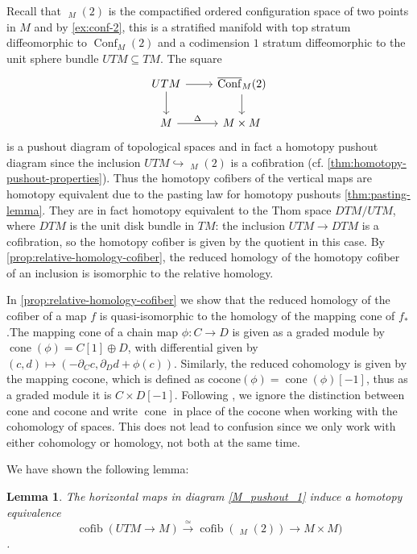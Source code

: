 \documentclass{scrartcl}
\theoremstyle{plain}
\newtheorem{lemma}[theorem]{Lemma}
\theoremstyle{definition}
\renewcommand{\subset}{\subseteq}
\DeclareMathOperator{\cone}{cone}
\DeclareMathOperator{\cofib}{cofib}
\newcommand{\quiso}{\simeq}
\let\xto\xrightarrow
\newcommand{\injto}{\hookrightarrow}
\DeclareMathOperator{\Conf}{Conf}
\DeclareMathOperator{\cConf}{\overline{Conf}}
\begin{document}
Recall that $\cConf_M(2)$ is the compactified ordered configuration space of two points in $M$ and by \cref{ex:conf-2}, this is a stratified manifold with top stratum diffeomorphic to $\Conf_M(2)$ and a codimension $1$ stratum diffeomorphic to the unit sphere bundle $UTM\subset TM$. The square
\begin{equation}\label{M_pushout_1}
\begin{tikzcd}
    UTM \dar\rar & \cConf_M(2)\dar \\
    M \rar["\Delta"] & M\times M
\end{tikzcd}
\end{equation}
is a pushout diagram of topological spaces and in fact a homotopy pushout diagram since the inclusion $UTM \injto \cConf_M(2)$ is a cofibration (cf. \cref{thm:homotopy-pushout-properties}). Thus the homotopy cofibers of the vertical maps are homotopy equivalent due to the pasting law for homotopy pushouts \cref{thm:pasting-lemma}. They are in fact homotopy equivalent to the Thom space $DTM / UTM$, where $DTM$ is the unit disk bundle in $TM$: the inclusion $UTM\to DTM$ is a cofibration, so the homotopy cofiber is given by the quotient in this case. By \cref{prop:relative-homology-cofiber}, the reduced homology of the homotopy cofiber of an inclusion is isomorphic to the relative homology. 

In \cref{prop:relative-homology-cofiber} we show that the reduced homology of the cofiber of a map $f$ is quasi-isomorphic to the homology of the mapping cone of $f_*$.The mapping cone of a chain map $\phi\colon C\to D$ is given as a graded module by $\cone(\phi) = C[1]\oplus D$, with differential given by $(c, d)\mapsto (-\partial_C c, \partial_D d + \phi(c))$. Similarly, the reduced cohomology is given by the mapping cocone, which is defined as $\mathrm{cocone}(\phi) = \cone(\phi)[-1]$, thus as a graded module it is $C\times D[-1]$. Following \cite{naef2019string}, we ignore the distinction between cone and cocone and write $\cone$ in place of the cocone when working with the cohomology of spaces. This does not lead to confusion since we only work with either cohomology or homology, not both at the same time. 

We have shown the following lemma:
\begin{lemma}\label{lem:M-cofib-hteq}
    The horizontal maps in diagram \ref{M_pushout_1} induce a homotopy equivalence $$\cofib(UTM\to M) \xto{\quiso} \cofib(\cConf_M(2))\to M\times M)$$.
\end{lemma}
\end{document}
